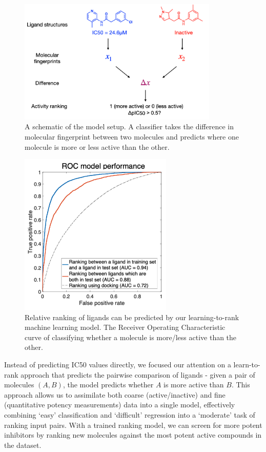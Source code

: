 \begin{figure}[!th]
    \centering
    \includegraphics[width=0.85\textwidth]{Chapters/Ranking/Figs/schematic.png}
    \caption{A schematic of the model setup. A classifier takes the difference in molecular fingerprint between two molecules and predicts where one molecule is more or less active than the other.}
    \label{fig:ranking_schematic}
\end{figure}

\begin{figure}[!th]
    \centering
    \includegraphics[width=0.65\textwidth]{Chapters/Ranking/Figs/roc_curve.png}
    \caption{Relative ranking of ligands can be predicted by our learning-to-rank machine learning model. The Receiver Operating Characteristic curve of classifying whether a molecule is more/less active than the other.}
    \label{fig:roc_plot}
\end{figure}

Instead of predicting IC50 values directly, we focused our attention on a learn-to-rank approach \cite{duffy2010molecular,agarwal2010ranking} that predicts the pairwise comparison of ligands - given a pair of molecules $(A,B)$, the model predicts whether $A$ is more active than $B$. This approach allows us to assimilate both coarse (active/inactive) and fine (quantitative potency measurements) data into a single model, effectively combining `easy' classification and `difficult' regression into a `moderate' task of ranking input pairs. With a trained ranking model, we can screen for more potent inhibitors by ranking new molecules against the most potent active compounds in the dataset.

